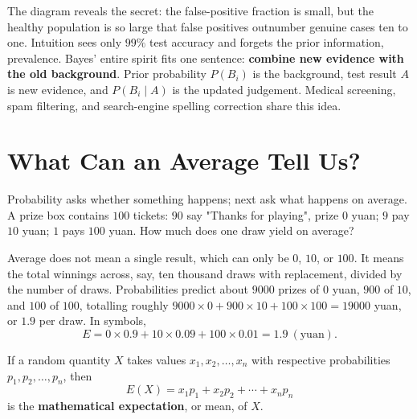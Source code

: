 \begin{center}
\end{center}

The diagram reveals the secret: the false-positive fraction is small, but the healthy population is so large that false positives outnumber genuine cases ten to one. Intuition sees only $99\%$ test accuracy and forgets the prior information, prevalence. Bayes' entire spirit fits one sentence: \textbf{combine new evidence with the old background}. Prior probability $P(B_i)$ is the background, test result $A$ is new evidence, and $P(B_i\mid A)$ is the updated judgement. Medical screening, spam filtering, and search-engine spelling correction share this idea.

\section{What Can an Average Tell Us?}

Probability asks whether something happens; next ask what happens on average. A prize box contains $100$ tickets: $90$ say "Thanks for playing", prize $0$ yuan; $9$ pay $10$ yuan; $1$ pays $100$ yuan. How much does one draw yield on average?

Average does not mean a single result, which can only be $0$, $10$, or $100$. It means the total winnings across, say, ten thousand draws with replacement, divided by the number of draws. Probabilities predict about $9000$ prizes of $0$ yuan, $900$ of $10$, and $100$ of $100$, totalling roughly $9000\times 0+900\times 10+100\times 100=19000$ yuan, or $1.9$ per draw. In symbols,
\[
E=0\times 0.9+10\times 0.09+100\times 0.01=1.9\ (\text{yuan}).
\]

\begin{dingyi}
If a random quantity $X$ takes values $x_1,x_2,\dots,x_n$ with respective probabilities $p_1,p_2,\dots,p_n$, then
\[
E(X)=x_1p_1+x_2p_2+\cdots+x_np_n
\]
is the \textbf{mathematical expectation}, or mean, of $X$.
\end{dingyi}

